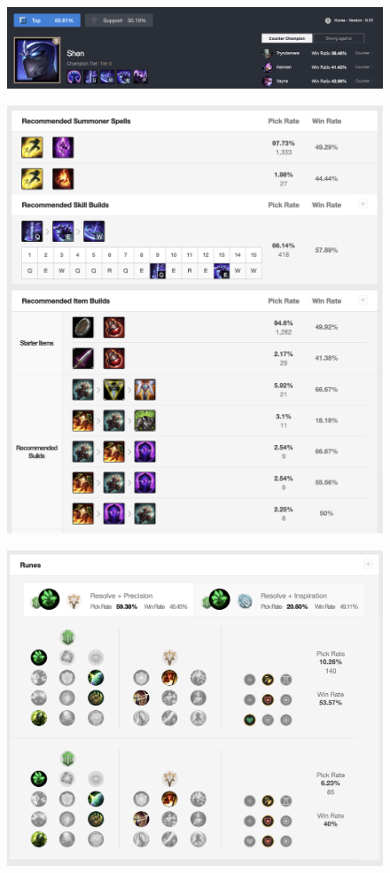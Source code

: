 \documentclass[10pt,landscape,a4paper,twocolumn]{article}
\begin{document}
\begin{figure}[ht]
\includegraphics[scale=0.3]{7}
\end{figure}
\begin{figure}[ht]
\includegraphics[scale=0.3]{8}
\end{figure}
\begin{figure}[ht]
\includegraphics[scale=0.3]{9}
\end{figure}
\end{document}

